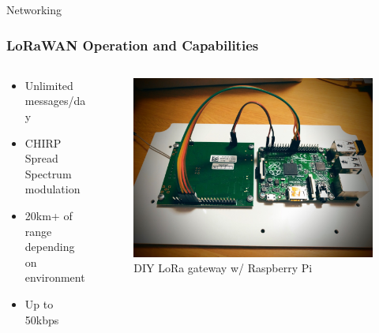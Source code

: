 \documentclass{beamer}
\begin{document}
  \begin{frame}{Networking}
    \frametitle{LoRaWAN Operation and Capabilities}
    \begin{columns}
      \begin{column}{0.5\textwidth}
        \begin{itemize}
          \item Unlimited messages/day
          \item CHIRP Spread Spectrum modulation
          \item 20km+ of range depending on environment
          \item Up to 50kbps
        \end{itemize}
      \end{column}
      \begin{column}{0.5\textwidth}
        \begin{figure}[htbp]
          \centering
          \includegraphics[width=\textwidth]{images/DIYloraGateway.jpg}
          \caption{DIY LoRa gateway w/ Raspberry Pi \cite{DIYLoRa}}
          \label{fig:DIY_LoRa_Gateway}
        \end{figure}
      \end{column}
    \end{columns}
  \end{frame}
\end{document}
